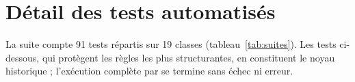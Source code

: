 \cleardoublepage
\appendix
{}

\chapter{Détail des tests automatisés}
\label{ann:tests}

La suite compte 91 tests répartis sur 19 classes (tableau~\ref{tab:suites}). Les tests
ci-dessous, qui protègent les règles les plus structurantes, en constituent le noyau
historique ; l'exécution complète par  se termine sans échec ni erreur.

\begingroup
\renewcommand{\code}[1]{\texttt{\footnotesize #1}}

